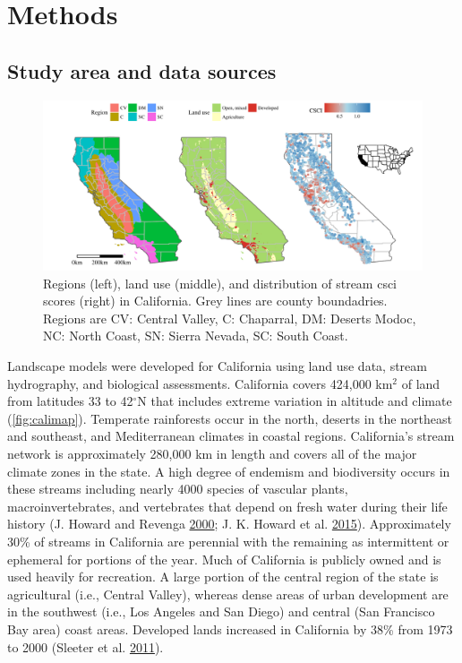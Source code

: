 \documentclass[]{article}
\begin{document}
\section{Methods}\label{methods}

\subsection{Study area and data
sources}\label{study-area-and-data-sources}

\begin{figure}
\centering
\includegraphics{figs/calimap-1.pdf}
\caption{Regions (left), land use (middle), and distribution of stream
\ac{csci} scores (right) in California. Grey lines are county
boundadries. Regions are CV: Central Valley, C: Chaparral, DM: Deserts
Modoc, NC: North Coast, SN: Sierra Nevada, SC: South Coast.}
\end{figure}

Landscape models were developed for California using land use data,
stream hydrography, and biological assessments. California covers
424,000 km\(^2\) of land from latitudes 33 to 42\(^\circ\)N that
includes extreme variation in altitude and climate (\cref{fig:calimap}).
Temperate rainforests occur in the north, deserts in the northeast and
southeast, and Mediterranean climates in coastal regions. California's
stream network is approximately 280,000 km in length and covers all of
the major climate zones in the state. A high degree of endemism and
biodiversity occurs in these streams including nearly 4000 species of
vascular plants, macroinvertebrates, and vertebrates that depend on
fresh water during their life history (J. Howard and Revenga
\protect\hyperlink{ref-Howard09}{2000}; J. K. Howard et al.
\protect\hyperlink{ref-Howard15}{2015}). Approximately 30\% of streams
in California are perennial with the remaining as intermittent or
ephemeral for portions of the year. Much of California is publicly owned
and is used heavily for recreation. A large portion of the central
region of the state is agricultural (i.e., Central Valley), whereas
dense areas of urban development are in the southwest (i.e., Los Angeles
and San Diego) and central (San Francisco Bay area) coast areas.
Developed lands increased in California by 38\% from 1973 to 2000
(Sleeter et al. \protect\hyperlink{ref-Sleeter11}{2011}).
\end{document}
